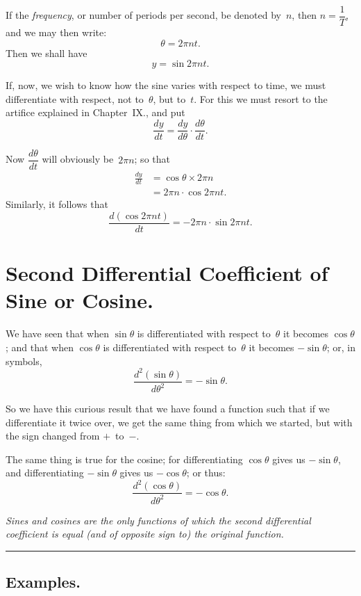 \documentclass[12pt]{book}%
\begin{document}
If the \emph{frequency}, or number of periods per second, be denoted by~$n$,
then $n = \dfrac{1}{T}$, and we may then write:
\[
\theta=2\pi nt.
\]
Then we shall have
\[
y = \sin2\pi nt.
\]


If, now, we wish to know how the sine varies with respect to time, we must
differentiate with respect, not to~$\theta$, but to~$t$. For this we must
resort to the artifice explained in Chapter~IX., and put
\[
\frac{dy}{dt} = \frac{dy}{d\theta} \cdot\frac{d\theta}{dt}.
\]


Now $\dfrac{d\theta}{dt}$ will obviously be~$2\pi n$; so that
\begin{align*}
\frac{dy}{dt}  &  =\cos\theta\times2\pi n\\
&  =2\pi n\cdot\cos2\pi nt.
\end{align*}
Similarly, it follows that%
\[
\frac{d(\cos2\pi nt)}{dt}=-2\pi n\cdot\sin2\pi nt.
\]


\section*{Second Differential Coefficient of Sine or Cosine.}

We have seen that when $\sin\theta$ is differentiated with respect to~$\theta$
it becomes $\cos\theta$; and that when $\cos\theta$ is differentiated with
respect to~$\theta$ it becomes $-\sin\theta$; or, in symbols,
\[
\frac{d^{2}(\sin\theta)}{d\theta^{2}} = -\sin\theta.
\]


So we have this curious result that we have found a function such that if we
differentiate it twice over, we get the same thing from which we started, but
with the sign changed from $+$~to~$-$.

The same thing is true for the cosine; for differentiating $\cos\theta$ gives
us $-\sin\theta$, and differentiating $-\sin\theta$ gives us $-\cos\theta$; or
thus:
\[
\frac{d^{2}(\cos\theta)}{d\theta^{2}} = -\cos\theta.
\]


\emph{Sines and cosines are the only functions of which the second
differential coefficient is equal \emph{(and of opposite sign to)} the
original function.}

\begin{center}
\rule{1.5in}{0.5pt}
\end{center}

\subsection*{Examples.}
\end{document}
